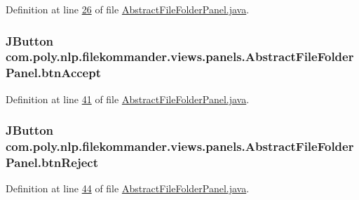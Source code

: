 Definition at line \hyperlink{L26}{26} of file \hyperlink{}{Abstract\-File\-Folder\-Panel.\-java}.

\hypertarget{classcom_1_1poly_1_1nlp_1_1filekommander_1_1views_1_1panels_1_1_abstract_file_folder_panel_a723f421b878bd4d7207a614376b03315}{
\subsubsection[{btn\-Accept}]{\setlength{\rightskip}{0pt plus 5cm}J\-Button com.\-poly.\-nlp.\-filekommander.\-views.\-panels.\-Abstract\-File\-Folder\-Panel.\-btn\-Accept\hspace{0.3cm}{\ttfamily [private]}}}\label{classcom_1_1poly_1_1nlp_1_1filekommander_1_1views_1_1panels_1_1_abstract_file_folder_panel_a723f421b878bd4d7207a614376b03315}


Definition at line \hyperlink{L41}{41} of file \hyperlink{}{Abstract\-File\-Folder\-Panel.\-java}.

\hypertarget{classcom_1_1poly_1_1nlp_1_1filekommander_1_1views_1_1panels_1_1_abstract_file_folder_panel_a3ae502ea80c38e1160cf63f3944638b2}{
\subsubsection[{btn\-Reject}]{\setlength{\rightskip}{0pt plus 5cm}J\-Button com.\-poly.\-nlp.\-filekommander.\-views.\-panels.\-Abstract\-File\-Folder\-Panel.\-btn\-Reject\hspace{0.3cm}{\ttfamily [private]}}}\label{classcom_1_1poly_1_1nlp_1_1filekommander_1_1views_1_1panels_1_1_abstract_file_folder_panel_a3ae502ea80c38e1160cf63f3944638b2}


Definition at line \hyperlink{L44}{44} of file \hyperlink{}{Abstract\-File\-Folder\-Panel.\-java}.


